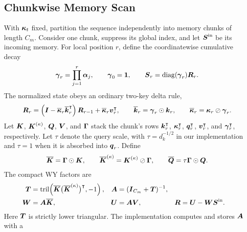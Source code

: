 \documentclass{article} %
\begin{document}
\subsection{Chunkwise Memory Scan}
\label{sec:chunkwise-memory}

With $\boldsymbol{\kappa}_t$ fixed, partition the sequence independently into memory chunks of length
$C_m$. Consider one chunk, suppress its global index, and let $\boldsymbol{S}^{\mathrm{in}}$ be its
incoming memory. For local position $r$, define the coordinatewise cumulative decay
\begin{equation}
  \boldsymbol{\gamma}_r=\prod_{j=1}^{r}\boldsymbol{\alpha}_j,
  \qquad
  \boldsymbol{\gamma}_0=\boldsymbol{1},
  \qquad
  \boldsymbol{S}_r=\operatorname{diag}(\boldsymbol{\gamma}_r)\boldsymbol{R}_r.
  \label{eq:chunk-memory-normalization}
\end{equation}
The normalized state obeys an ordinary two-key delta rule,
\begin{equation}
  \boldsymbol{R}_r
  =\left(\boldsymbol{I}-\overline{\boldsymbol{\kappa}}_r\overline{\boldsymbol{k}}_r^{\intercal}\right)
    \boldsymbol{R}_{r-1}
   +\overline{\boldsymbol{\kappa}}_r\boldsymbol{v}_r^{\intercal},
  \qquad
  \overline{\boldsymbol{k}}_r=\boldsymbol{\gamma}_r\odot\boldsymbol{k}_r,
  \qquad
  \overline{\boldsymbol{\kappa}}_r=\boldsymbol{\kappa}_r\oslash\boldsymbol{\gamma}_r.
  \label{eq:chunk-memory-normalized-recurrence}
\end{equation}
Let $\boldsymbol{K}$, $\boldsymbol{K}^{(\kappa)}$, $\boldsymbol{Q}$, $\boldsymbol{V}$, and $\boldsymbol{\Gamma}$ stack the chunk's
rows $\boldsymbol{k}_r^{\intercal}$, $\boldsymbol{\kappa}_r^{\intercal}$, $\boldsymbol{q}_r^{\intercal}$, $\boldsymbol{v}_r^{\intercal}$, and
$\boldsymbol{\gamma}_r^{\intercal}$, respectively. Let $\tau$ denote the query scale, with
$\tau=d_k^{-1/2}$ in our implementation and $\tau=1$ when it is absorbed into $\boldsymbol{q}_r$. Define
\begin{equation}
  \overline{\boldsymbol{K}}=\boldsymbol{\Gamma}\odot\boldsymbol{K},
  \qquad
  \overline{\boldsymbol{K}}^{(\kappa)}=\boldsymbol{K}^{(\kappa)}\oslash\boldsymbol{\Gamma},
  \qquad
  \overline{\boldsymbol{Q}}=\tau\boldsymbol{\Gamma}\odot\boldsymbol{Q}.
  \label{eq:chunk-memory-scaled-keys}
\end{equation}
The compact WY factors are
\begin{equation}
\begin{aligned}
  \boldsymbol{T}
  &=\operatorname{tril}\!\left(
      \overline{\boldsymbol{K}}\bigl(\overline{\boldsymbol{K}}^{(\kappa)}\bigr)^{\intercal},-1
    \right),
  &
  \boldsymbol{A}&=(\boldsymbol{I}_{C_m}+\boldsymbol{T})^{-1},
  \\
  \boldsymbol{W}&=\boldsymbol{A}\overline{\boldsymbol{K}},
  &
  \boldsymbol{U}&=\boldsymbol{A}\boldsymbol{V},
  &
  \boldsymbol{R}&=\boldsymbol{U}-\boldsymbol{W}\boldsymbol{S}^{\mathrm{in}}.
\end{aligned}
  \label{eq:chunk-memory-wy}
\end{equation}
Here $\boldsymbol{T}$ is strictly lower triangular. The implementation computes and stores $\boldsymbol{A}$ with a
\end{document}
